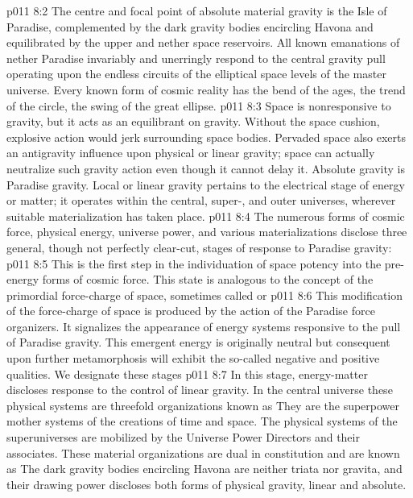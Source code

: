 \vs p011 8:2 The centre and focal point of absolute material gravity is the Isle of Paradise, complemented by the dark gravity bodies encircling Havona and equilibrated by the upper and nether space reservoirs. All known emanations of nether Paradise invariably and unerringly respond to the central gravity pull operating upon the endless circuits of the elliptical space levels of the master universe. Every known form of cosmic reality has the bend of the ages, the trend of the circle, the swing of the great ellipse.
\vs p011 8:3 Space is nonresponsive to gravity, but it acts as an equilibrant on gravity. Without the space cushion, explosive action would jerk surrounding space bodies. Pervaded space also exerts an antigravity influence upon physical or linear gravity; space can actually neutralize such gravity action even though it cannot delay it. Absolute gravity is Paradise gravity. Local or linear gravity pertains to the electrical stage of energy or matter; it operates within the central, super-, and outer universes, wherever suitable materialization has taken place.
\vs p011 8:4 \pc The numerous forms of cosmic force, physical energy, universe power, and various materializations disclose three general, though not perfectly clear\hyp{}cut, stages of response to Paradise gravity:
\vs p011 8:5 \bibnobreakspace {} This is the first step in the individuation of space potency into the pre\hyp{}energy forms of cosmic force. This state is analogous to the concept of the primordial force\hyp{}charge of space, sometimes called  or 
\vs p011 8:6 \bibnobreakspace {} This modification of the force\hyp{}charge of space is produced by the action of the Paradise force organizers. It signalizes the appearance of energy systems responsive to the pull of Paradise gravity. This emergent energy is originally neutral but consequent upon further metamorphosis will exhibit the so\hyp{}called negative and positive qualities. We designate these stages 
\vs p011 8:7 \bibnobreakspace {} In this stage, energy\hyp{}matter discloses response to the control of linear gravity. In the central universe these physical systems are threefold organizations known as  They are the superpower mother systems of the creations of time and space. The physical systems of the superuniverses are mobilized by the Universe Power Directors and their associates. These material organizations are dual in constitution and are known as  The dark gravity bodies encircling Havona are neither triata nor gravita, and their drawing power discloses both forms of physical gravity, linear and absolute.
